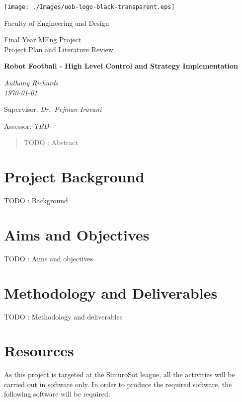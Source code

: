 \documentclass[a4paper,10pt]{article}
\begin{document}
\begin{titlepage}
  \setlength{\parindent}{0cm}

  \texttt{[image: ./Images/uob-logo-black-transparent.eps]}

  \Large
  Faculty of Engineering and Design

  \vspace{80pt}

  \LARGE
  Final Year MEng Project \\
  Project Plan and Literature Review

  \vspace{80pt}
  \textbf{Robot Football - High Level Control and Strategy Implementation}

  \vspace{10pt}
  \emph{Anthony Richards} \\
  \emph{\today}

  \vspace{80pt}
  Supervisor: \emph{Dr.~Pejman Iravani}

  \vspace{10pt}
  Assessor: \emph{TBD}
\end{titlepage}


\begin{abstract}
TODO : Abstract
\end{abstract}

\tableofcontents

\cleardoublepage


\section{Project Background}
TODO : Background

\section{Aims and Objectives}
TODO : Aims and objectives

\section{Methodology and Deliverables}
TODO : Methodology and deliverables

\section{Resources}
As this project is targeted at the SimuroSot league, all the activities will be carried out in software only.  In order to produce the required software, the following software will be required:
\end{document}

